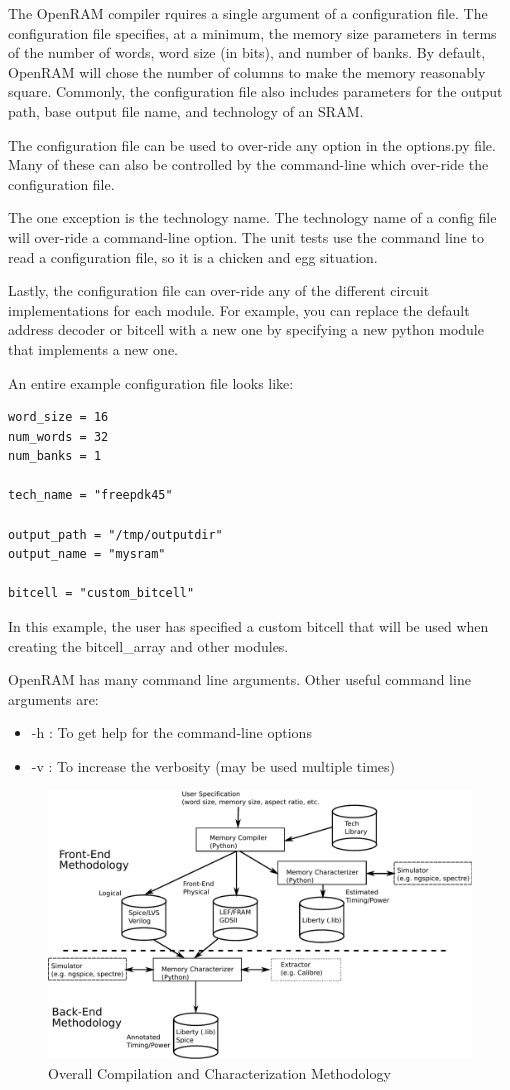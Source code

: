 The OpenRAM compiler rquires a single argument of a configuration
file. The configuration file specifies, at a minimum, the memory size
parameters in terms of the number of words, word size (in bits), and
number of banks. By default, OpenRAM will chose the number of columns
to make the memory reasonably square. Commonly, the configuration file
also includes parameters for the output path, base output file name,
and technology of an SRAM.

The configuration file can be used to over-ride any option in the
options.py file.  Many of these can also be controlled by the command-line
which over-ride the configuration file.

The one exception is the technology name. The technology name of a
config file will over-ride a command-line option. The unit tests use
the command line to read a configuration file, so it is a chicken and
egg situation.

Lastly, the configuration file can over-ride any of the different
circuit implementations for each module. For example, you can replace
the default address decoder or bitcell with a new one by specifying a
new python module that implements a new one.

An entire example configuration file looks like:
\begin{verbatim}
word_size = 16
num_words = 32
num_banks = 1

tech_name = "freepdk45"

output_path = "/tmp/outputdir"
output_name = "mysram"

bitcell = "custom_bitcell"
\end{verbatim}
In this example, the user has specified a custom bitcell that will be
used when creating the bitcell\_array and other modules.

OpenRAM has many command line arguments. Other useful command line arguments are:
\begin{itemize}
\item -h : To get help for the command-line options
\item -v : To increase the verbosity (may be used multiple times)
\end{itemize}

\begin{figure}[tb]
\centering
\includegraphics[width=14cm]{./figs/methodology.pdf}
\caption{Overall Compilation and Characterization Methodology
\label{fig:methodology}}
\end{figure}






